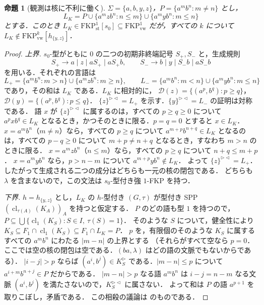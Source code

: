 \documentclass[11pt,a4paper]{ltjsarticle}
\numberwithin{equation}{section}
\theoremstyle{plain}
\newtheorem{proposition}[theorem]{命題}
\theoremstyle{definition}
\theoremstyle{remark}
\theoremstyle{plain}
\newcommand{\eps}{\lambda}
\newcommand{\R}{^{\rhd}}
\newcommand{\RL}{^{\rhd\lhd}}
\newcommand{\cl}{\operatorname{cl}}
\newcommand{\D}{\mathcal D}
\newcommand{\FKP}[2]{\mathrm{FKP}^{#1}_{\mathrm{#2}}}
\newcommand{\tFKP}[3]{\mathrm{FKP}^{#1}_{\mathrm{#2}}[#3]}
\begin{document}
\begin{proposition}[観測は核に不利に働く]\label{prop:strict-kernel}
$\Sigma=\{a,b,y,z\}$，$P=\{a^mb^n:m\ne n\}$ とし，
\[
L_K=P\cup\{a^mzb^n:n\le m\}\cup\{a^myb^n:m\le n\}
\]
とする．このとき $L_K\in\tFKP1{st}{s_0}\subseteq\FKP1{vw}$ だが，すべての $k$ について $L_K\notin\tFKP{k}{vw}{h_{\{y,z\}}}$．
\end{proposition}
\begin{proof}
\emph{上界.}  $s_0$-型がともに $0$ の二つの初期非終端記号 $S_+,S_-$ と，生成規則
\[
S_+\to a\mid z\mid aS_+\mid aS_+b,\qquad
S_-\to b\mid y\mid S_-b\mid aS_-b
\]
を用いる．それぞれの言語は
\[
L_+=\{a^mb^n:m>n\}\cup\{a^mzb^n:m\ge n\},\qquad
L_-=\{a^mb^n:m<n\}\cup\{a^myb^n:m\le n\}
\]
であり，その和は $L_K$ である．$L_K$ に相対的に，
$\D(z)=\{(a^p,b^q):p\ge q\}$，$\D(y)=\{(a^p,b^q):p\le q\}$．
$\{z\}\RL=L_+$ を示す．$\{y\}\RL=L_-$ の証明は対称である．
語 $x$ が $\{z\}\RL$ に属するのは，すべての $p\ge q\ge0$ について $a^pxb^q\in L_K$ となるとき，かつそのときに限る．$p=q=0$ とすると $x\in L_K$．
$x=a^mb^n$（$m\ne n$）なら，すべての $p\ge q$ について $a^{m+p}b^{n+q}\in L_K$ となるのは，すべての $p-q\ge0$ について $m+p\ne n+q$ となるとき，すなわち $m>n$ のときに限る．
$x=a^mzb^n$（$n\le m$）なら，すべての $p\ge q$ について $n+q\le m+p$．
$x=a^myb^n$ なら，$p>n-m$ について $a^{m+p}yb^{n}\notin L_K$．
よって $\{z\}\RL=L_+$．したがって生成される二つの成分はどちらも一元の核の閉包である．
どちらも $\eps$ を含まないので，この文法は $s_0$-型付き強 $1$-FKP を持つ．

\emph{下界.}  $h=h_{\{y,z\}}$ とし，$L_K$ の $h$-型付き $(G,\tau)$ が型付き SPP $(\cl_{\tau(A)}(K_A))_A$ を持つと仮定する．
$P$ のどの語も型 $1$ を持つので，$P\subseteq\bigcup\{\cl_1(K_S):S\in I,\ \tau(S)=1\}$．
そのような $S$ について，健全性により $K_S\subseteq F_1\cap\cl_1(K_S)\subseteq F_1\cap L_K=P$．
$p$ を，有限個のそのような $K_S$ に属するすべての $a^mb^n$ にわたる $|m-n|$ の上界とする
（それらがすべて空なら $p=0$．ここでは空の核の閉包は空である．$(ba,\eps)$ はどの語の文脈でもないからである）．
$|i-j|>p$ ならば $(a^i,b^j)\in K_S\R$ である．$|m-n|\le p$ について $a^{i+m}b^{n+j}\in P$ だからである．
$|m-n|>p$ なる語 $a^mb^n$ は $i-j=n-m$ なる文脈 $(a^i,b^j)$ を満たさないので，$K_S\RL$ に属さない．
よって和は $P$ の語 $a^{p+1}$ を取りこぼし，矛盾である．
この相殺の議論は \citet[Prop.~2(ii)]{ky2017} のものである．
\end{proof}
\end{document}
